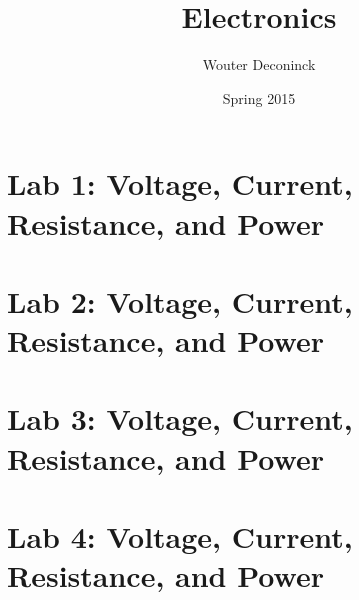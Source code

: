 \documentclass{book}
\title{Electronics}
\date{Spring 2015}
\author{Wouter Deconinck}
\begin{document}
\maketitle
\tableofcontents

\chapter{Lab 1: Voltage, Current, Resistance, and Power}




\chapter{Lab 2: Voltage, Current, Resistance, and Power}




\chapter{Lab 3: Voltage, Current, Resistance, and Power}




\chapter{Lab 4: Voltage, Current, Resistance, and Power}



\end{document}
